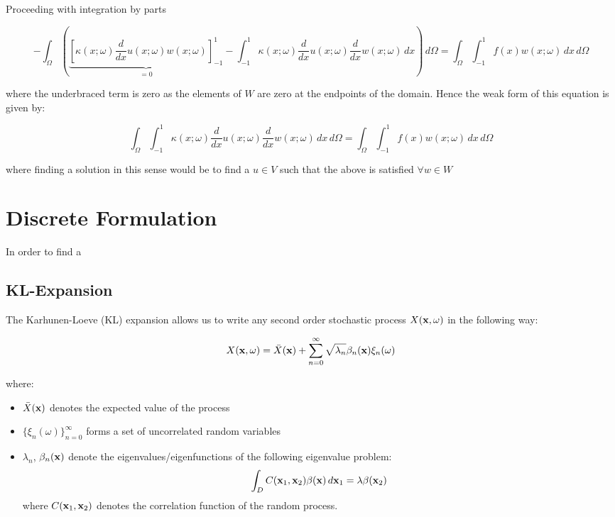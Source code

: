 Proceeding with integration by parts

\begin{equation}
    -\int_{\Omega}\left(
      \underbrace{\left[\kappa(x;\omega)\frac{d}{dx}u(x;\omega)
                        w(x;\omega)\right]_{-1}^1}_{= 0}
       -\int_{-1}^1\kappa(x;\omega)\frac{d}{dx}u(x;\omega)\frac{d}{dx}w(x;\omega)\, dx
    \right)\, d\Omega = \int_{\Omega}\int_{-1}^1 f(x)w(x;\omega)\, dx\, d\Omega
\end{equation}

where the underbraced term is zero as the elements of $W$ are zero at the
endpoints of the domain. Hence the weak form of this equation is given by:

\begin{equation}\label{eq:wk-two-d-stochastic}
    \int_{\Omega}\int_{-1}^1\kappa(x;\omega)
           \frac{d}{dx}u(x;\omega)\frac{d}{dx}w(x;\omega)\, dx\, d\Omega =
           \int_{\Omega}\int_{-1}^1 f(x)w(x;\omega)\, dx\, d\Omega
\end{equation}

where finding a solution in this sense would be to find a $u \in V$ such that
the above is satisfied $\forall w \in W$

\section{Discrete Formulation}

In order to find a

\subsection{KL-Expansion}

The Karhunen-Loeve (KL) expansion allows us to write any second order
stochastic process $X(\mathbf{x},\omega)$ in the following way:

\begin{equation}
    X(\mathbf{x}, \omega) = \bar{X}(\mathbf{x})
    + \sum_{n = 0}^\infty\sqrt{\lambda_n}\beta_n(\mathbf{x})\xi_n(\omega)
\end{equation}

where:

\begin{itemize}
    \item $\bar{X}(\mathbf{x})$ denotes the expected value of the process
    \item $\{\xi_n(\omega)\}_{n=0}^\infty$ forms a set of uncorrelated random
          variables
    \item $\lambda_n$, $\beta_n(\mathbf{x})$ denote the eigenvalues/eigenfunctions
          of the following eigenvalue problem:
          \[
                \int_DC(\mathbf{x}_1, \mathbf{x}_2)\beta(\mathbf{x})\, d\mathbf{x}_1
                = \lambda\beta(\mathbf{x}_2)
          \]
          where $C(\mathbf{x}_1,\mathbf{x}_2)$ denotes the correlation function of the
          random process.
\end{itemize}

